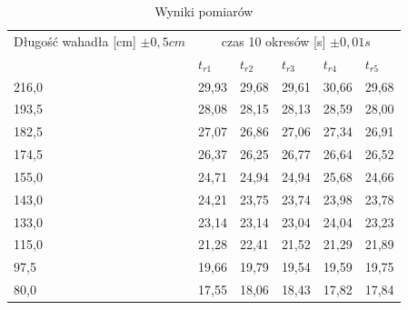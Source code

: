 \documentclass[a4paper,12pt]{article}
\begin{document}
\begin{table}[h]
	\centering
	\begin{tabular}{|l|l|l|l|l|l|}
		\hline
		Długość wahadła [cm] $\pm 0,5cm$ & \multicolumn{5}{c|}{czas 10 okresów [s] $\pm 0,01s$}                                             \\
		                                 & $t_{r1}$                                             & $t_{r2}$ & $t_{r3}$ & $t_{r4}$ & $t_{r5}$ \\\hline
		216,0                            & 29,93                                                & 29,68    & 29,61    & 30,66    & 29,68    \\\hline
		193,5                            & 28,08                                                & 28,15    & 28,13    & 28,59    & 28,00    \\\hline
		182,5                            & 27,07                                                & 26,86    & 27,06    & 27,34    & 26,91    \\ \hline
		174,5                            & 26,37                                                & 26,25    & 26,77    & 26,64    & 26,52    \\ \hline
		155,0                            & 24,71                                                & 24,94    & 24,94    & 25,68    & 24,66    \\ \hline
		143,0                            & 24,21                                                & 23,75    & 23,74    & 23,98    & 23,78    \\ \hline
		133,0                            & 23,14                                                & 23,14    & 23,04    & 24,04    & 23,23    \\ \hline
		115,0                            & 21,28                                                & 22,41    & 21,52    & 21,29    & 21,89    \\ \hline
		97,5                             & 19,66                                                & 19,79    & 19,54    & 19,59    & 19,75    \\ \hline
		80,0                             & 17,55                                                & 18,06    & 18,43    & 17,82    & 17,84    \\\hline
	\end{tabular}
	\caption{Wyniki pomiarów}
\end{table}
\end{document}
